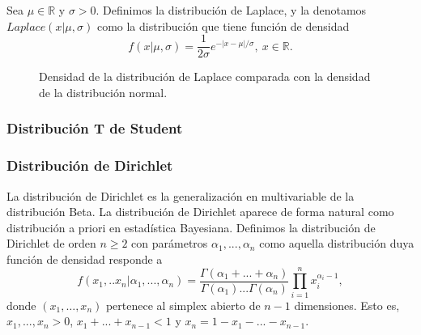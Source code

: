 \begin{definition}
    Sea $\mu \in \mathbb{R}$ y $\sigma > 0$. Definimos la distribución de Laplace, y la denotamos $Laplace(x | \mu, \sigma)$ como la distribución que tiene función de densidad
    \[f(x | \mu, \sigma) = \frac{1}{2 \sigma} e^{-|x - \mu| / \sigma}, \ x \in \mathbb{R}.\]
\end{definition}

\begin{figure}[H]
    \caption{Densidad de la distribución de Laplace comparada con la densidad de la distribución normal.}
    \label{fig:laplace}
\end{figure}


\subsubsection{Distribución T de Student}

\subsubsection{Distribución de Dirichlet}
		La distribución de Dirichlet es la generalización en multivariable de la distribución Beta. La distribución de Dirichlet aparece de forma natural como distribución a priori en estadística Bayesiana. Definimos la distribución de Dirichlet de orden $n \geq 2$ con parámetros $\alpha_1, ..., \alpha_n$ como aquella distribución duya función de densidad responde a
		\begin{equation*}
		f(x_1, .. x_n|\alpha_1, ...,\alpha_n) = \frac{\Gamma(\alpha_1 + ... + \alpha_n)}{\Gamma(\alpha_1)  ...  \Gamma(\alpha_n)} \prod_{i=1}^{n} {x_i ^ {\alpha_i - 1}},
		\end{equation*}
		donde $(x_1, \ldots, x_n)$ pertenece al simplex abierto de $n-1$ dimensiones. Esto es, $x_1, ... , x_n > 0$, $x_1 + ... + x_{n-1} < 1$ y $x_n =  1 - x_1 - ... - x_{n-1}$.

